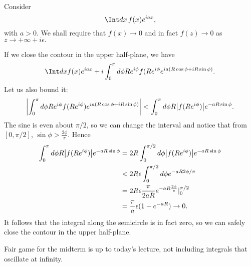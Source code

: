 \begin{exm}
    Consider
    \begin{equation}
        \Int dx \, f(x) e^{iax},
    \end{equation}
    with $a>0$. We shall require that $f(x) \to 0$ and in fact $f(z)\to 0$ as $z\to +\infty + i\epsilon.$
    
    If we close the contour in the upper half-plane, we have
    \begin{equation}
        \Int dx f(x) e^{iax} + i \int_0^\pi d\phi Re^{i\phi} f(Re^{i\phi} e^{ia(R\cos\phi + i R\sin\phi)}.
    \end{equation}
    Let us also bound it:
    \begin{equation}
        \abs*{ \int_0^\pi d\phi Re^{i\phi} f(Re^{i\phi}) e^{ia(R\cos\phi + i R\sin\phi)}} < \int_0^\pi d\phi R\abs*{f(Re^{i\phi})} e^{-a R\sin\phi}.
    \end{equation}
    The sine is even about $\pi/2$, so we can change the interval and notice that from $[0,\pi/2]$, $\sin\phi > \frac{2\phi}{\pi}$. Hence
    \begin{align*}
        \int_0^\pi d\phi R\abs*{f(Re^{i\phi})} e^{-a R\sin\phi} &= 2R\int_0^{\pi/2} d\phi  \abs*{f(Re^{i\phi})} e^{-a R\sin\phi}\\
            &< 2R \epsilon \int_0^{\pi/2} d\phi e^{-aR 2\phi/\pi}\\
            &= 2R\epsilon \frac{\pi}{2aR} e^{-aR \frac{2\phi}{\pi}}|_0^{\pi/2}\\
            &= \frac{\pi}{a} \epsilon(1-e^{-aR}) \to 0.
    \end{align*}
    It follows that the integral along the semicircle is in fact zero, so we can safely close the contour in the upper half-plane.
\end{exm}

Fair game for the midterm is up to today's lecture, not including integrals that oscillate at infinity.